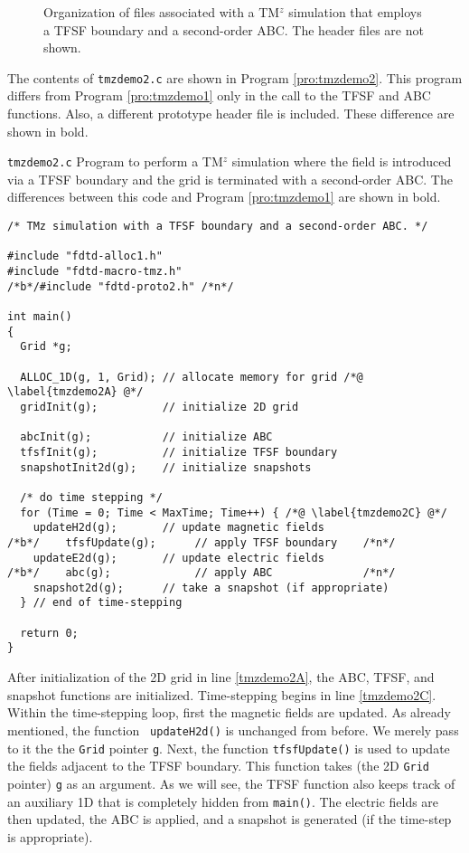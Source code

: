 \begin{figure}
  \begin{center}
  \end{center} \caption{Organization of files associated with a TM$^z$
  simulation that employs a TFSF boundary and a second-order ABC.  The header files are
  not shown.}  \label{fig:tmzdemo2}
\end{figure}

The contents of {\tt tmzdemo2.c} are shown in Program
\ref{pro:tmzdemo2}.  This program differs from Program
\ref{pro:tmzdemo1} only in the call to the TFSF and ABC functions.
Also, a different prototype header file is included.  These difference
are shown in bold.

\begin{program}
{\tt tmzdemo2.c} 
Program to perform a TM$^z$ simulation where the field is introduced
via a TFSF boundary and the grid is terminated with a second-order
ABC.  The differences between this code and Program \ref{pro:tmzdemo1}
are shown in bold.
\label{pro:tmzdemo2}
\codemiddle
\begin{lstlisting}
/* TMz simulation with a TFSF boundary and a second-order ABC. */

#include "fdtd-alloc1.h"
#include "fdtd-macro-tmz.h" 
/*b*/#include "fdtd-proto2.h" /*n*/

int main()
{
  Grid *g;

  ALLOC_1D(g, 1, Grid); // allocate memory for grid /*@ \label{tmzdemo2A} @*/
  gridInit(g);          // initialize 2D grid

  abcInit(g);           // initialize ABC
  tfsfInit(g);          // initialize TFSF boundary
  snapshotInit2d(g);    // initialize snapshots

  /* do time stepping */
  for (Time = 0; Time < MaxTime; Time++) { /*@ \label{tmzdemo2C} @*/
    updateH2d(g);       // update magnetic fields 
/*b*/    tfsfUpdate(g);      // apply TFSF boundary    /*n*/
    updateE2d(g);       // update electric fields 
/*b*/    abc(g);             // apply ABC              /*n*/
    snapshot2d(g);      // take a snapshot (if appropriate)
  } // end of time-stepping

  return 0;
}
\end{lstlisting}
\end{program}

After initialization of the 2D grid in line \ref{tmzdemo2A}, the ABC,
TFSF, and snapshot functions are initialized.  Time-stepping begins in
line \ref{tmzdemo2C}.  Within the time-stepping loop, first the
magnetic fields are updated.  As already mentioned, the function {\tt
updateH2d()} is unchanged from before.  We merely pass to it the the
{\tt Grid} pointer {\tt g}.  Next, the function {\tt tfsfUpdate()} is
used to update the fields adjacent to the TFSF boundary.  This
function takes (the 2D {\tt Grid} pointer) {\tt g} as an argument.  As we will
see, the TFSF function also keeps track of an auxiliary 1D that is
completely hidden from {\tt main()}.  The electric fields are then
updated, the ABC is applied, and a snapshot is generated (if the
time-step is appropriate).

